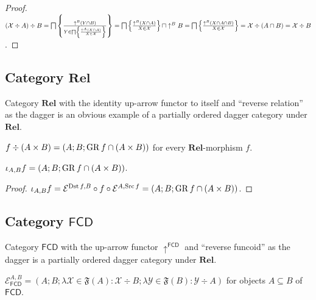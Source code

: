 \begin{proof}
  $(\mathcal{X} \div A) \div B = \bigsqcap \left\{ \frac{ \uparrow^B  (Y \cap B)
  }{ Y \in \bigsqcap \left\{ \frac{ \uparrow^A  (X \cap A)}{X \in \mathcal{X} }\right\} \mathcal{} }\right\} =
  \bigsqcap \left\{ \frac{ \uparrow^B  (X \cap A) }{ X \in
  \mathcal{X} }\right\} \sqcap \uparrow^B B = \bigsqcap \left\{ \frac{ \uparrow^B  (X
  \cap A \cap B) }{ X \in \mathcal{X} }\right\} =
  \mathcal{X} \div (A \cap B) = \mathcal{X} \div B$.
\end{proof}

\subsection{\texorpdfstring{Category $\mathbf{Rel}$}{Category Rel}}

Category $\mathbf{Rel}$ with the identity up-arrow functor to itself
and ``reverse relation'' as the dagger is an obvious example of a partially
ordered dagger category under $\mathbf{Rel}$.

\begin{defn}
  $f \div (A \times B) = (A ; B ; \operatorname{GR} f \cap (A \times B))$ for every
  $\mathbf{Rel}$-morphism $f$.
\end{defn}

\begin{prop}
  $\iota_{A, B} f = (A ; B ; \operatorname{GR} f \cap (A \times B))$.
\end{prop}

\begin{proof}
  $\iota_{A, B} f = \mathcal{E}^{\operatorname{Dst} f, B} \circ f \circ \mathcal{E}^{A, \operatorname{Src} f} = (A ; B ; \operatorname{GR} f \cap (A \times B))$.
\end{proof}

\subsection{\texorpdfstring{Category $\mathsf{FCD}$}{Category FCD}}

Category $\mathsf{FCD}$ with the up-arrow functor
$\uparrow^{\mathsf{FCD}}$ and ``reverse funcoid'' as the dagger is a
partially ordered dagger category under $\mathbf{Rel}$.

\begin{prop}
  $\mathcal{E}_{\mathsf{FCD}}^{A,B} = (A ; B ; \lambda \mathcal{X}
  \in \mathfrak{F} (A) : \mathcal{X} \div B ; \lambda \mathcal{Y} \in
  \mathfrak{F} (B) : \mathcal{Y} \div A)$ for objects $A \subseteq B$ of
  $\mathsf{FCD}$.
\end{prop}

